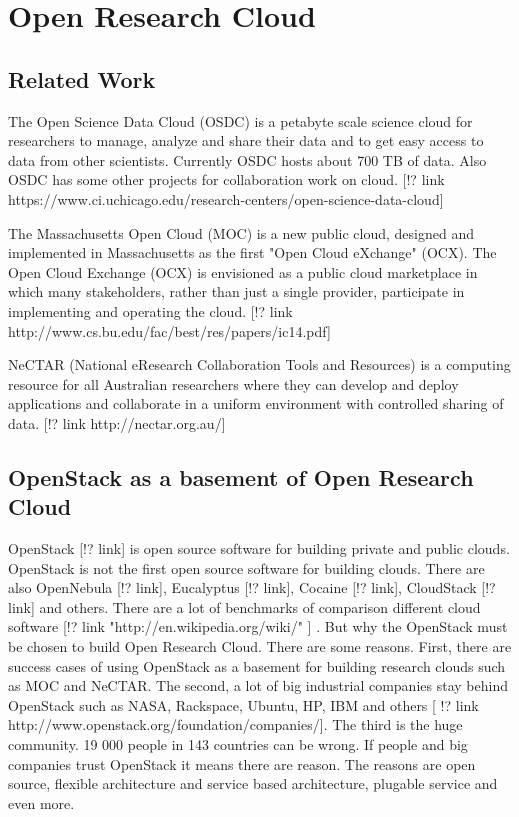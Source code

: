 %


\section{Open Research Cloud}

\subsection{Related Work}
The Open Science Data Cloud (OSDC) is a petabyte scale science cloud for researchers to manage, analyze and share their data and to get easy access to data from other scientists. Currently OSDC hosts about 700 TB of data. Also OSDC has some other projects for collaboration work on cloud. [!? link https://www.ci.uchicago.edu/research-centers/open-science-data-cloud]

The Massachusetts Open Cloud (MOC) is a new public cloud, designed and implemented in Massachusetts as the first "Open Cloud eXchange" (OCX). The Open Cloud Exchange (OCX) is envisioned as a public cloud marketplace in which many stakeholders, rather than just a single provider, participate in 
implementing and operating the cloud. [!? link http://www.cs.bu.edu/fac/best/res/papers/ic14.pdf]


NeCTAR (National eResearch Collaboration Tools and Resources) is a computing resource for all Australian researchers where they can develop and deploy applications and collaborate in a uniform environment with controlled sharing of data. [!? link http://nectar.org.au/]



\subsection{OpenStack as a basement of Open Research Cloud}
OpenStack [!? link] is open source software for building private and public clouds. OpenStack is not the first open source software for building clouds. There are also OpenNebula [!? link], Eucalyptus [!? link], Cocaine [!? link], CloudStack [!? link] and others. There are a lot of benchmarks of comparison different cloud software [!? link "http://en.wikipedia.org/wiki/" ] . But why the OpenStack must be chosen to build Open Research Cloud. There are some reasons. First, there are success cases of using OpenStack as a basement for building research clouds such as MOC and NeCTAR. The second, a lot of big industrial companies stay behind OpenStack such as NASA, Rackspace, Ubuntu, HP, IBM and others [ !? link http://www.openstack.org/foundation/companies/]. The third is the huge community. 19 000 people in 143 countries can be wrong. If people and big companies trust OpenStack it means there are reason. The reasons are open source, flexible architecture and service based architecture, plugable service and even more.  

